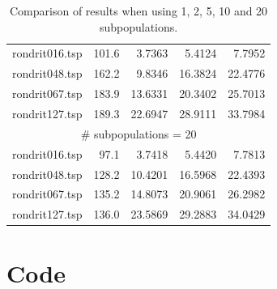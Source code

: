 \documentclass{report}
\begin{document}
\begin{table}[H]
{\begin{tabular}{l rrrr}
			\midrule
			rondrit016.tsp & 101.6 & 3.7363 & 5.4124 & 7.7952 \\
			rondrit048.tsp & 162.2 & 9.8346 & 16.3824 & 22.4776 \\
			rondrit067.tsp & 183.9 & 13.6331 & 20.3402 & 25.7013 \\
			rondrit127.tsp & 189.3 & 22.6947 & 28.9111 & 33.7984 \\
			\midrule
			\multicolumn{5}{c}{\# subpopulations = 20}\\ 
			\midrule
			rondrit016.tsp & 97.1 & 3.7418 & 5.4420 & 7.7813 \\
			rondrit048.tsp & 128.2 & 10.4201 & 16.5968 & 22.4393 \\
			rondrit067.tsp & 135.2 & 14.8073 & 20.9061 & 26.2982 \\
			rondrit127.tsp & 136.0 & 23.5869 & 29.2883 & 34.0429 \\
			\bottomrule
		\end{tabular}
	}
	\caption{Comparison of results when using 1, 2, 5, 10 and 20 subpopulations.}
	\label{tab:diversity}
\end{table}

\newpage
\section{Code}








 
\end{document}
